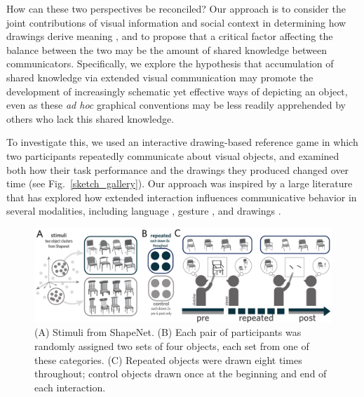 \documentclass[10pt,letterpaper]{article}
\begin{document}
How can these two perspectives be reconciled?
Our approach is to consider the joint contributions of visual information and social context in determining how drawings derive meaning \cite{abell2009canny}, and to propose that a critical factor affecting the balance between the two may be the amount of shared knowledge between communicators.
Specifically, we explore the hypothesis that accumulation of shared knowledge via extended visual communication may promote the development of increasingly schematic yet effective ways of depicting an object, even as these \textit{ad hoc} graphical conventions may be less readily apprehended by others who lack this shared knowledge.

To investigate this, we used an interactive drawing-based reference game in which two participants repeatedly communicate about visual objects, and examined both how their task performance and the drawings they produced changed over time (see Fig.~\ref{sketch_gallery}).
Our approach was inspired by a large literature that has explored how extended interaction influences communicative behavior in several modalities, including language \cite{ClarkWilkesGibbs86_ReferringCollaborative,HawkinsFrankGoodman17_ConventionFormation}, gesture \cite{goldin1996silence}, and drawings \cite{garrod_foundations_2007,galantucci2005experimental}.


\begin{figure}
\begin{center}
\includegraphics[width=0.86\linewidth]{figures/task_stimuli.pdf}
\caption{(A) Stimuli from ShapeNet. (B) Each pair of participants was randomly assigned two sets of four objects, each set from one of these categories. (C) Repeated objects were drawn eight times throughout; control objects drawn once at the beginning and end of each interaction.}
\label{task_stimuli}
\vspace{-1em}
\end{center}
\end{figure}
\end{document}
